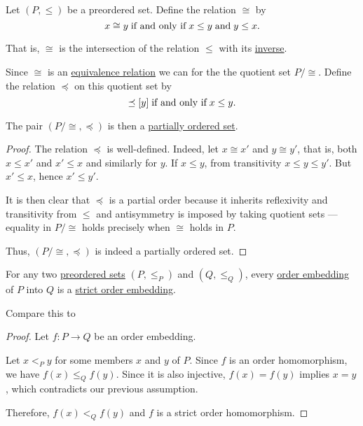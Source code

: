 \begin{proposition}\label{thm:preorder_to_partial_order}
  Let \( (P, \leq) \) be a preordered set. Define the relation \( \cong \) by
  \begin{equation}\label{eq:thm:preorder_to_partial_order/equivalence}
    x \cong y \T{if and only if} x \leq y \T{and} y \leq x.
  \end{equation}

  That is, \( \cong \) is the intersection of the relation \( \leq \) with its \hyperref[def:binary_relation/converse]{inverse}.

  Since \( \cong \) is an \hyperref[def:equivalence_relation]{equivalence relation} we can for the the quotient set \( P / \cong \). Define the relation \( \preceq \) on this quotient set by
  \begin{equation*}
    [x] \preceq [y] \T{if and only if} x \leq y.
  \end{equation*}

  The pair \( (P / \cong, \preceq) \) is then a \hyperref[def:partially_ordered_set]{partially ordered set}.
\end{proposition}
\begin{proof}
  The relation \( \preceq \) is well-defined. Indeed, let \( x \cong x' \) and \( y \cong y' \), that is, both \( x \leq x' \) and \( x' \leq x \) and similarly for \( y \). If \( x \leq y \), from transitivity \( x \leq y \leq y' \). But \( x' \leq x \), hence \( x' \leq y' \).

  It is then clear that \( \preceq \) is a partial order because it inherits reflexivity and transitivity from \( \leq \) and antisymmetry is imposed by taking quotient sets --- equality in \( P / \cong \) holds precisely when \( \cong \) holds in \( P \).

  Thus, \( (P / \cong, \preceq) \) is indeed a partially ordered set.
\end{proof}

\begin{proposition}\label{thm:order_embedding_is_strict}
  For any two \hyperref[def:preordered_set]{preordered sets} \( (P, \leq_P) \) and \( (Q, \leq_Q) \), every \hyperref[def:partially_ordered_set/homomorphism]{order embedding} of \( P \) into \( Q \) is a \hyperref[def:partially_ordered_set/homomorphism]{strict order embedding}.

  Compare this to 
\end{proposition}
\begin{proof}
  Let \( f: P \to Q \) be an order embedding.

  Let \( x <_P y \) for some members \( x \) and \( y \) of \( P \). Since \( f \) is an order homomorphism, we have \( f(x) \leq_Q f(y) \). Since it is also injective, \( f(x) = f(y) \) implies \( x = y \), which contradicts our previous assumption.

  Therefore, \( f(x) <_Q f(y) \) and \( f \) is a strict order homomorphism.
\end{proof}

